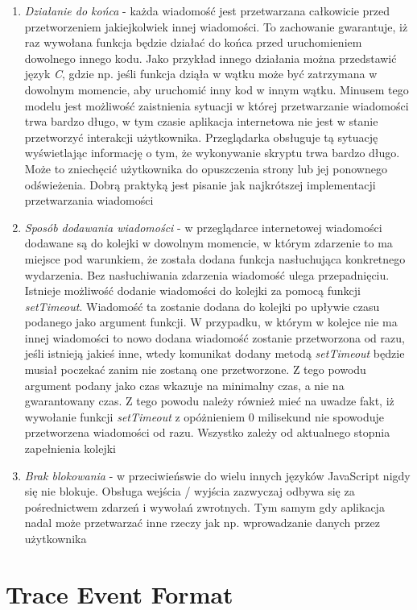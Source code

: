 \documentclass[polish, twoside, 12pt]{mwart}
\let\stdsection\section
\renewcommand*{\section}{\clearpage\stdsection}
\begin{document}
\begin{enumerate}
  \item \emph{Działanie do końca} - każda wiadomość jest przetwarzana całkowicie przed przetworzeniem jakiejkolwiek innej wiadomości. To zachowanie gwarantuje, iż raz wywołana funkcja będzie działać do końca przed uruchomieniem dowolnego innego kodu. Jako przykład innego działania można przedstawić język \emph{C}, gdzie np. jeśli funkcja dziąła w wątku może być zatrzymana w dowolnym momencie, aby uruchomić inny kod w innym wątku. Minusem tego modelu jest możliwość zaistnienia sytuacji w której przetwarzanie wiadomości trwa bardzo długo, w tym czasie aplikacja internetowa nie jest w stanie przetworzyć interakcji użytkownika. Przeglądarka obsługuje tą sytuację wyświetlając informację o tym, że wykonywanie skryptu trwa bardzo długo. Może to zniechęcić użytkownika do opuszczenia strony lub jej ponownego odświeżenia. Dobrą praktyką jest pisanie jak najkrótszej implementacji przetwarzania wiadomości
  \item \emph{Sposób dodawania wiadomości} - w przeglądarce internetowej wiadomości dodawane są do kolejki w dowolnym momencie, w którym zdarzenie to ma miejsce pod warunkiem, że została dodana funkcja nasłuchująca konkretnego wydarzenia. Bez nasłuchiwania zdarzenia wiadomość ulega przepadnięciu. Istnieje możliwość dodanie wiadomości do kolejki za pomocą funkcji \emph{setTimeout}. Wiadomość ta zostanie dodana do kolejki po upływie czasu podanego jako argument funkcji. W przypadku, w którym w kolejce nie ma innej wiadomości to nowo dodana wiadomość zostanie przetworzona od razu, jeśli istnieją jakieś inne, wtedy komunikat dodany metodą \emph{setTimeout} będzie musiał poczekać zanim nie zostaną one przetworzone. Z tego powodu argument podany jako czas wkazuje na minimalny czas, a nie na gwarantowany czas. Z tego powodu należy również mieć na uwadze fakt, iż wywołanie funkcji \emph{setTimeout} z opóżnieniem 0 milisekund nie spowoduje przetworzena wiadomości od razu. Wszystko zależy od aktualnego stopnia zapełnienia kolejki
  \item \emph{Brak blokowania} - w przeciwieńswie do wielu innych języków JavaScript nigdy się nie blokuje. Obsługa wejścia / wyjścia zazwyczaj odbywa się za pośrednictwem zdarzeń i wywołań zwrotnych. Tym samym gdy aplikacja nadal może przetwarzać inne rzeczy jak np. wprowadzanie danych przez użytkownika
\end{enumerate}

\section{Trace Event Format} \label{trace-event-format-section}
\end{document}
